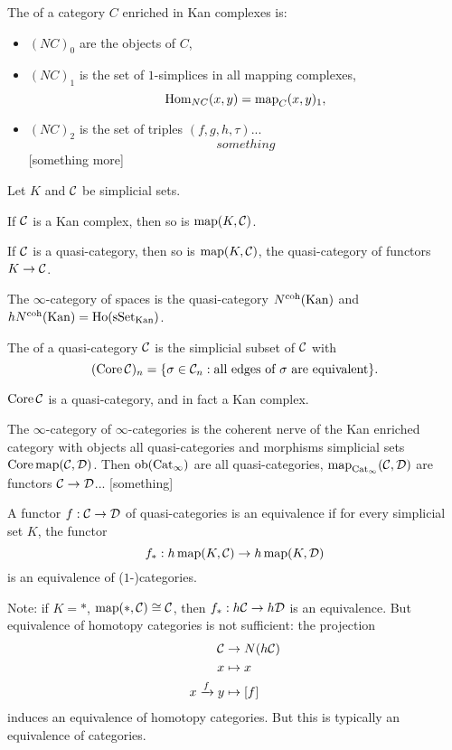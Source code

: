 The  of a category $C$ enriched in Kan complexes is:
\begin{itemize}
    \item $(NC)_0$ are the objects of $C$,
    \item $(NC)_1$ is the set of $1$-simplices in all mapping complexes,
    \[\operatorname{Hom}_{NC}(x,y)=\operatorname{map}_C(x,y)_1,\]
    \item $(NC)_2$ is the set of triples $(f,g,h,\tau)$...
    \[something\]
    [something more]
\end{itemize}

\begin{proposition}
Let $K$ and $\mathcal{C}$ be simplicial sets.
\begin{numerate}
\item If $\mathcal{C}$ is a Kan complex, then so is $\operatorname{map}(K,\mathcal{C})$.
\item If $\mathcal{C}$ is a quasi-category, then so is $\operatorname{map}(K,\mathcal{C})$, the quasi-category of functors $K\to\mathcal{C}$.
\end{numerate}
\end{proposition}

The $\infty$-category of spaces is the quasi-category $N^\text{coh}({\mathrm{Kan}})$ and $hN^\text{coh}({\mathrm{Kan}})=\operatorname{Ho}({\mathrm{sSet}}_\text{Kan})$.

The  of a quasi-category $\mathcal{C}$ is the simplicial subset of $\mathcal{C}$ with
\[(\operatorname{Core}\mathcal{C})_n=\{\sigma\in\mathcal{C}_n:\text{all edges of }\sigma\text{ are equivalent}\}.\]

\begin{theorem}
$\operatorname{Core}\mathcal{C}$ is a quasi-category, and in fact a Kan complex.
\end{theorem}

The $\infty$-category of $\infty$-categories is the coherent nerve of the Kan enriched category with objects all quasi-categories and morphisms simplicial sets $\operatorname{Core}\operatorname{map}(\mathcal{C},\mathcal{D})$. Then $\operatorname{ob}({\mathrm{Cat}}_\infty)$ are all quasi-categories, $\operatorname{map}_{{\mathrm{Cat}}_\infty}(\mathcal{C},\mathcal{D})$ are functors $\mathcal{C}\to\mathcal{D}$... [something]

A functor $f:\mathcal{C}\to\mathcal{D}$ of quasi-categories is an equivalence if for every simplicial set $K$, the functor
\[f_*:h\operatorname{map}(K,\mathcal{C})\to h\operatorname{map}(K,\mathcal{D})\]
is an equivalence of ($1$-)categories.

Note: if $K=*$, $\operatorname{map}(*,\mathcal{C})\cong\mathcal{C}$, then $f_*:h\mathcal{C}\to h\mathcal{D}$ is an equivalence. But equivalence of homotopy categories is not sufficient: the projection
\begin{align*}
    \mathcal{C}&\to N(h\mathcal{C})\\
    x&\mapsto x\\
    x\xrightarrow{f}y&\mapsto[f]
\end{align*}
induces an equivalence of homotopy categories. But this is typically  an equivalence of categories.

